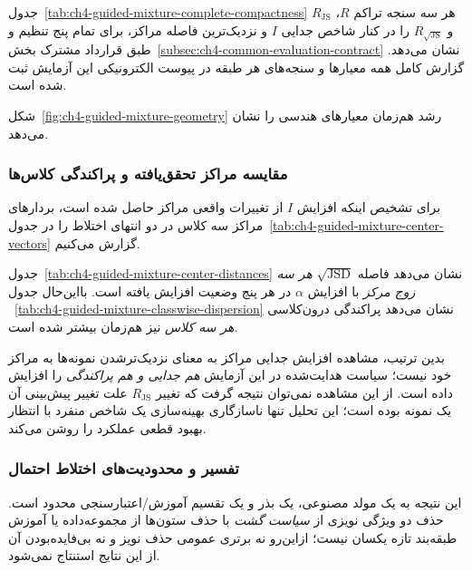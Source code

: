 جدول~\ref{tab:ch4-guided-mixture-complete-compactness}
هر سه سنجه تراکم $R$، $R_{\mathrm{JS}}$ و
$R_{\sqrt{\mathrm{JS}}}$ را در کنار
شاخص جدایی $I$ و نزدیک‌ترین فاصله مراکز،
برای تمام پنج تنظیم و طبق قرارداد مشترک
بخش~\ref{subsec:ch4-common-evaluation-contract}
نشان می‌دهد. گزارش کامل همه معیارها و
سنجه‌های هر طبقه در پیوست الکترونیکی
این آزمایش ثبت شده است.

شکل~\ref{fig:ch4-guided-mixture-geometry}
رشد هم‌زمان معیارهای هندسی را نشان می‌دهد.


\subsubsection{مقایسه مراکز تحقق‌یافته و پراکندگی کلاس‌ها}
\label{subsec:ch4-guided-probability-centers}
برای تشخیص اینکه افزایش $I$ از تغییرات
واقعی مراکز حاصل شده است، بردارهای مراکز
سه کلاس در دو انتهای اختلاط را در
جدول~\ref{tab:ch4-guided-mixture-center-vectors}
گزارش می‌کنیم.


جدول~\ref{tab:ch4-guided-mixture-center-distances}
نشان می‌دهد فاصله $\sqrt{\mathrm{JSD}}$
\emph{هر سه زوج مرکز} با افزایش $\alpha$
در هر پنج وضعیت افزایش یافته است.
بااین‌حال جدول
~\ref{tab:ch4-guided-mixture-classwise-dispersion}
نشان می‌دهد پراکندگی درون‌کلاسی
\emph{هر سه کلاس} نیز هم‌زمان بیشتر شده است.



بدین ترتیب، مشاهده افزایش جدایی مراکز
به معنای نزدیک‌ترشدن نمونه‌ها به مراکز
خود نیست؛ سیاست هدایت‌شده در این آزمایش
\emph{هم جدایی و هم پراکندگی} را افزایش داده
است. از این مشاهده نمی‌توان نتیجه گرفت
که تغییر $R_{\mathrm{JS}}$ علت تغییر پیش‌بینی
آن یک نمونه بوده است؛ این تحلیل تنها
ناسازگاری بهینه‌سازی یک شاخص منفرد
با انتظار بهبود قطعی عملکرد را روشن می‌کند.

\subsubsection{تفسیر و محدودیت‌های اختلاط احتمال}
\label{subsec:ch4-guided-probability-discussion}
این نتیجه به یک مولد مصنوعی، یک بذر و یک تقسیم آموزش/اعتبارسنجی محدود است.
حذف دو ویژگی نویزی از \emph{سیاست گشت} با حذف ستون‌ها از مجموعه‌داده
یا آموزش طبقه‌بند تازه یکسان نیست؛ ازاین‌رو نه برتری عمومی حذف نویز
و نه بی‌فایده‌بودن آن از این نتایج استنتاج نمی‌شود.


